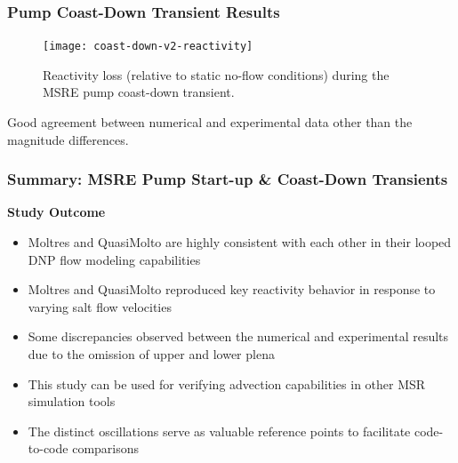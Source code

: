 
\begin{frame}
  \frametitle{Pump Coast-Down Transient Results}
  \begin{figure}[t]
    \centering
    \texttt{[image: coast-down-v2-reactivity]}
    \caption{Reactivity loss (relative to static no-flow conditions) during the \gls{MSRE} pump
    coast-down transient.}
    \label{fig:start-up-reactivity}
  \end{figure}
  Good agreement between numerical and experimental data other than the magnitude differences.
\end{frame}

\begin{frame}
  \frametitle{Summary: MSRE Pump Start-up \& Coast-Down Transients}
  \begin{block}{\textbf{Study Outcome}}
    \begin{itemize}
      \item Moltres and QuasiMolto are highly consistent with each other in their looped DNP flow
        modeling capabilities
      \item Moltres and QuasiMolto reproduced key reactivity behavior in response to varying salt
        flow velocities
      \item Some discrepancies observed between the numerical and experimental results due to the
        omission of upper and lower plena
      \item This study can be used for verifying advection capabilities in other MSR simulation tools
      \item The distinct oscillations serve as valuable reference points to facilitate code-to-code
        comparisons
    \end{itemize}
  \end{block}
\end{frame}
